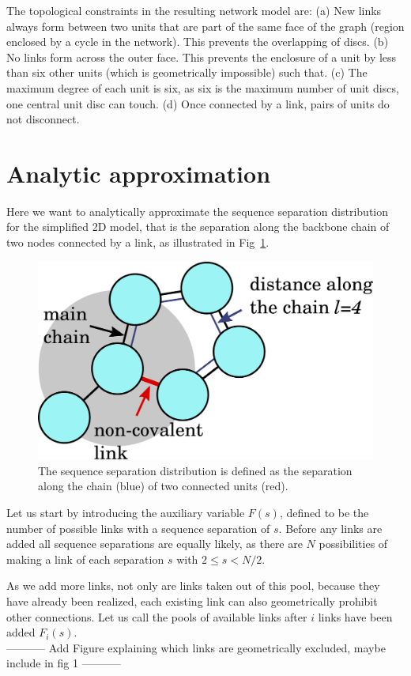 \documentclass[reprint,amsmath,amssymb,rmp,onecolumn,notitlepage,11pt]{revtex4-1}
\newcommand{\red}[1]{\textcolor{red!80!black}{#1}}
\begin{document}
The topological constraints in the resulting network model are:
(a) New links always form between two units that are part of the same face of the graph (region enclosed by a cycle in the network). This prevents the overlapping of discs. (b) No links form across the outer face. This prevents the enclosure of a unit by less than six other units (which is geometrically impossible) such that. (c) The maximum degree of each unit is six, as six is the maximum number of unit discs, one central unit disc can touch. (d) Once connected by a link, pairs of units do not disconnect.

\section*{Analytic approximation}
Here we want to analytically approximate the sequence separation distribution for the simplified 2D model, that is the separation along the backbone chain of two nodes connected by a link, as illustrated in Fig~\ref{fig:fig_prn_vis}.
\begin{figure}[h]
    \centering
    \includegraphics[width=0.3\columnwidth]{figures/prn_vis.pdf}
    \caption{The sequence separation distribution is defined as the separation along the chain (blue) of two connected units (red).}
    \label{fig:fig_prn_vis}
\end{figure}

Let us start by introducing the auxiliary variable $F(s)$, defined to be the number of possible links with a sequence separation of $s$. Before any links are added all sequence separations are equally likely, as there are $N$ possibilities of making a link of each separation $s$ with $2\leq s < N/2$.

As we add more links, not only are links taken out of this pool, because they have already been realized, each existing link can also geometrically prohibit other connections.
Let us call the pools of available links after $i$ links have been added $F_i(s)$.
\\

\red{----------- Add Figure explaining which links are geometrically excluded, maybe include in fig 1 -----------}
\\
\end{document}
